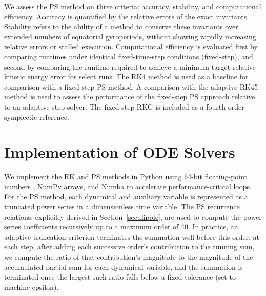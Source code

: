 \documentclass{article}
\begin{document}


We assess the PS method on three criteria: accuracy, stability, and computational efficiency. Accuracy is quantified by the relative errors of the exact invariants. Stability refers to the ability of a method to conserve these invariants over extended numbers of equatorial gyroperiods, without showing rapidly increasing relative errors or stalled execution. Computational efficiency is evaluated first by comparing runtimes under identical fixed-time-step conditions (fixed-step), and second by comparing the runtime required to achieve a minimum target relative kinetic energy error for select runs. The RK4 method is used as a baseline for comparison with a fixed-step PS method. A comparison with the adaptive RK45 method is used to assess the performance of the fixed-step PS approach relative to an adaptive-step solver. The fixed-step RKG is included as a fourth-order symplectic reference.

\section{Implementation of ODE Solvers}
\label{sect:implementation}
We implement the RK and PS methods in Python using 64-bit floating-point numbers \cite{IEEE754}, NumPy \cite{harris2020} arrays, and Numba \cite{lam2015} to accelerate performance-critical loops. For the PS method, each dynamical and auxiliary variable is represented as a truncated power series in a dimensionless time variable. The PS recurrence relations, explicitly derived in Section~\ref{sec:dipole}, are used to compute the power series coefficients recursively up to a maximum order of 40. In practice, an adaptive truncation criterion terminates the summation well before this order: at each step, after adding each successive order's contribution to the running sum, we compute the ratio of that contribution's magnitude to the magnitude of the accumulated partial sum for each dynamical variable, and the summation is terminated once the largest such ratio falls below a fixed tolerance (set to machine epsilon).
\end{document}
